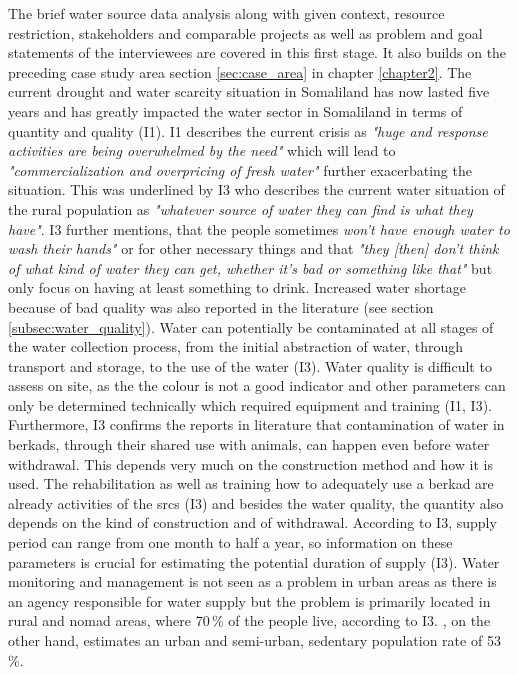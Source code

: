 The brief water source data analysis along with given context, resource restriction, stakeholders and comparable projects as well as problem and goal statements of the interviewees are covered in this first stage. It also builds on the preceding case study area section \ref{sec:case_area} in chapter \ref{chapter2}.\newline
The current drought and water scarcity situation in Somaliland has now lasted five years and has greatly impacted the water sector in Somaliland in terms of quantity and quality (I1). I1 describes the current crisis as \textit{"huge and response activities are being overwhelmed by the need"} which will lead to \textit{"commercialization and overpricing of fresh water"} further exacerbating the situation. This was underlined by I3 who describes the current water situation of the rural population as \textit{"whatever source of water they can find is what they have"}. I3 further mentions, that the people sometimes \textit{won't have enough water to wash their hands"} or for other necessary things and that \textit{"they [then] don't think of what kind of water they can get, whether it's bad or something like that"} but only focus on having at least something to drink. Increased water shortage because of bad quality was also reported in the literature (see section \ref*{subsec:water_quality}). Water can potentially be contaminated at all stages of the water collection process, from the initial abstraction of water, through transport and storage, to the use of the water (I3). Water quality is difficult to assess on site, as the the colour is not a good indicator and other parameters can only be determined technically which required equipment and training (I1, I3). Furthermore, I3 confirms the reports in literature that contamination of water in berkads, through their shared use with animals, can happen even before water withdrawal. This depends very much on the construction method and how it is used. The rehabilitation as well as training how to adequately use a berkad are already activities of the \acrshort*{srcs} (I3) and besides the water quality, the quantity also depends on the kind of construction and of withdrawal. According to I3, supply period can range from one month to half a year, so information on these parameters is crucial for estimating the potential duration of supply (I3).\newline
Water monitoring and management is not seen as a problem in urban areas as there is an agency responsible for water supply but the problem is primarily located in rural and nomad areas, where 70\,\% of the people live, according to I3. \autocite{republicofsomaliaCountryProfile20212021}, on the other hand, estimates an urban and semi-urban, sedentary population rate of 53\,\%.\newline
